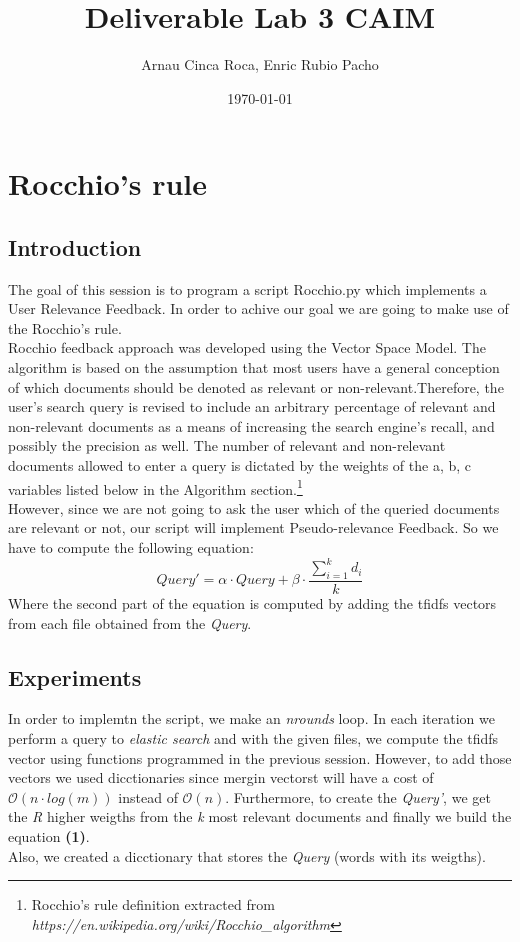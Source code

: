 \documentclass[11pt]{article}
\title{Deliverable Lab 3 CAIM}
\author{Arnau Cinca Roca, Enric Rubio Pacho}
\date\today
\begin{document}
\maketitle

\section{Rocchio's rule}
\subsection{Introduction}
The goal of this session is to program a script Rocchio.py which implements a User Relevance Feedback. In order to achive our goal we are going to make use of the Rocchio's rule.\\
Rocchio feedback approach was developed using the Vector Space Model. The algorithm is based on the assumption that most users have a general conception of which documents should be denoted as relevant or non-relevant.Therefore, the user's search query is revised to include an arbitrary percentage of relevant and non-relevant documents as a means of increasing the search engine's recall, and possibly the precision as well. The number of relevant and non-relevant documents allowed to enter a query is dictated by the weights of the a, b, c variables listed below in the Algorithm section.\footnote{Rocchio's rule definition extracted from \textit{https://en.wikipedia.org/wiki/Rocchio\_algorithm}} \\
However, since we are not going to ask the user which of the queried documents are relevant or not, our script will implement Pseudo-relevance Feedback. So we have to compute the following equation:
\begin{equation}
Query' = \alpha\cdot Query + \beta\cdot \frac{\sum\limits_{i = 1}^{k}d_i}{k}
\end{equation}
Where the second part of the equation is computed by adding the tfidfs vectors from each file obtained from the \textit{Query}. \\

\subsection{Experiments}
In order to implemtn the script, we make an \textit{nrounds} loop. In each iteration we perform a query to \textit{elastic search} and with the given files, we compute the tfidfs vector using functions programmed in the previous session. However, to add those vectors we used dicctionaries since mergin vectorst will have a cost of $\mathcal{O}(n\cdot log(m))$ instead of $\mathcal{O}(n)$.
Furthermore, to create the \textit{Query'}, we get the \textit{R} higher weigths from the \textit{k} most relevant documents and finally we build the equation \textbf{(1)}.\\
Also, we created a dicctionary that stores the \textit{Query} (words with its weigths).\\
\end{document}
